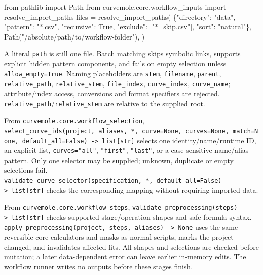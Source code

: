 \documentclass[
  10pt,
  a4paper,
  oneside]{scrreprt}
\newenvironment{Shaded}{}{}
\newcommand{\ImportTok}[1]{#1}
\newcommand{\NormalTok}[1]{#1}
\newcommand{\OperatorTok}[1]{\textcolor[rgb]{0.40,0.40,0.40}{#1}}
\newcommand{\StringTok}[1]{\textcolor[rgb]{0.25,0.44,0.63}{#1}}
\newcommand{\VariableTok}[1]{\textcolor[rgb]{0.10,0.09,0.49}{#1}}
\begin{document}
\begin{Shaded}
\begin{Highlighting}[]
\ImportTok{from}\NormalTok{ pathlib }\ImportTok{import}\NormalTok{ Path}
\ImportTok{from}\NormalTok{ curvemole.core.workflow\_inputs }\ImportTok{import}\NormalTok{ resolve\_import\_paths}
\NormalTok{files }\OperatorTok{=}\NormalTok{ resolve\_import\_paths(}
\NormalTok{    \{}\StringTok{"directory"}\NormalTok{: }\StringTok{"data"}\NormalTok{, }\StringTok{"pattern"}\NormalTok{: }\StringTok{"*.csv"}\NormalTok{, }\StringTok{"recursive"}\NormalTok{: }\VariableTok{True}\NormalTok{,}
     \StringTok{"exclude"}\NormalTok{: [}\StringTok{"*\_skip.csv"}\NormalTok{], }\StringTok{"sort"}\NormalTok{: }\StringTok{"natural"}\NormalTok{\},}
\NormalTok{    Path(}\StringTok{"/absolute/path/to/workflow{-}folder"}\NormalTok{),}
\NormalTok{)}
\end{Highlighting}
\end{Shaded}

A literal \texttt{path} is still one file. Batch matching skips symbolic
links, supports explicit hidden pattern components, and fails on empty
selection unless \texttt{allow\_empty=True}. Naming placeholders are
\texttt{stem}, \texttt{filename}, \texttt{parent},
\texttt{relative\_path}, \texttt{relative\_stem}, \texttt{file\_index},
\texttt{curve\_index}, \texttt{curve\_name}; attribute/index access,
conversions and format specifiers are rejected.
\texttt{relative\_path}/\texttt{relative\_stem} are relative to the
supplied root.

From \texttt{curvemole.core.workflow\_selection},
\texttt{select\_curve\_ids(project,\ aliases,\ *,\ curve=None,\ curves=None,\ match=None,\ default\_all=False)\ -\textgreater{}\ list{[}str{]}}
selects one identity/name/runtime ID, an explicit list,
\texttt{curves="all"}, \texttt{"first"}, \texttt{"last"}, or a
case-sensitive name/alias pattern. Only one selector may be supplied;
unknown, duplicate or empty selections fail.
\texttt{validate\_curve\_selector(specification,\ *,\ default\_all=False)\ -\textgreater{}\ list{[}str{]}}
checks the corresponding mapping without requiring imported data.

From \texttt{curvemole.core.workflow\_steps},
\texttt{validate\_preprocessing(steps)\ -\textgreater{}\ list{[}str{]}}
checks supported stage/operation shapes and safe formula syntax.
\texttt{apply\_preprocessing(project,\ steps,\ aliases)\ -\textgreater{}\ None}
uses the same reversible core calculators and masks as normal scripts,
marks the project changed, and invalidates affected fits. All shapes and
selections are checked before mutation; a later data-dependent error can
leave earlier in-memory edits. The workflow runner writes no outputs
before these stages finish.
\end{document}
